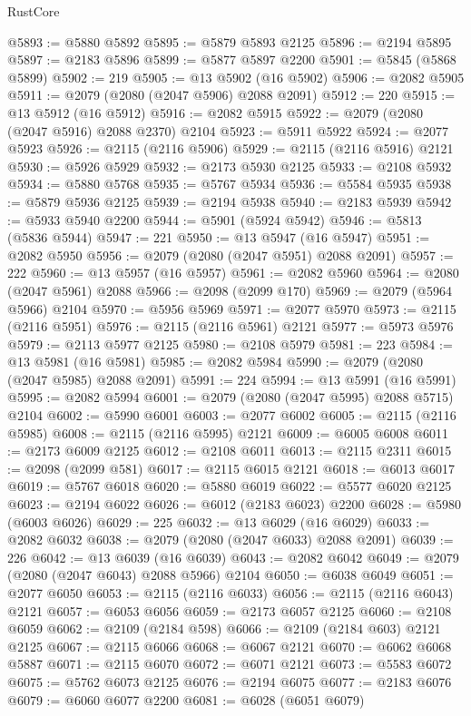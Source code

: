 \begin{lexlean}{RustCore}
\begin{coremodule}
@5893 := @5880 @5892
@5895 := @5879 @5893 @2125
@5896 := @2194 @5895
@5897 := @2183 @5896
@5899 := @5877 @5897 @2200
@5901 := @5845 (@5868 @5899)
@5902 := 219
@5905 := @13 @5902 (@16 @5902)
@5906 := @2082 @5905
@5911 := @2079 (@2080 (@2047 @5906) @2088 @2091)
@5912 := 220
@5915 := @13 @5912 (@16 @5912)
@5916 := @2082 @5915
@5922 := @2079 (@2080 (@2047 @5916) @2088 @2370) @2104
@5923 := @5911 @5922
@5924 := @2077 @5923
@5926 := @2115 (@2116 @5906)
@5929 := @2115 (@2116 @5916) @2121
@5930 := @5926 @5929
@5932 := @2173 @5930 @2125
@5933 := @2108 @5932
@5934 := @5880 @5768
@5935 := @5767 @5934
@5936 := @5584 @5935
@5938 := @5879 @5936 @2125
@5939 := @2194 @5938
@5940 := @2183 @5939
@5942 := @5933 @5940 @2200
@5944 := @5901 (@5924 @5942)
@5946 := @5813 (@5836 @5944)
@5947 := 221
@5950 := @13 @5947 (@16 @5947)
@5951 := @2082 @5950
@5956 := @2079 (@2080 (@2047 @5951) @2088 @2091)
@5957 := 222
@5960 := @13 @5957 (@16 @5957)
@5961 := @2082 @5960
@5964 := @2080 (@2047 @5961) @2088
@5966 := @2098 (@2099 @170)
@5969 := @2079 (@5964 @5966) @2104
@5970 := @5956 @5969
@5971 := @2077 @5970
@5973 := @2115 (@2116 @5951)
@5976 := @2115 (@2116 @5961) @2121
@5977 := @5973 @5976
@5979 := @2113 @5977 @2125
@5980 := @2108 @5979
@5981 := 223
@5984 := @13 @5981 (@16 @5981)
@5985 := @2082 @5984
@5990 := @2079 (@2080 (@2047 @5985) @2088 @2091)
@5991 := 224
@5994 := @13 @5991 (@16 @5991)
@5995 := @2082 @5994
@6001 := @2079 (@2080 (@2047 @5995) @2088 @5715) @2104
@6002 := @5990 @6001
@6003 := @2077 @6002
@6005 := @2115 (@2116 @5985)
@6008 := @2115 (@2116 @5995) @2121
@6009 := @6005 @6008
@6011 := @2173 @6009 @2125
@6012 := @2108 @6011
@6013 := @2115 @2311
@6015 := @2098 (@2099 @581)
@6017 := @2115 @6015 @2121
@6018 := @6013 @6017
@6019 := @5767 @6018
@6020 := @5880 @6019
@6022 := @5577 @6020 @2125
@6023 := @2194 @6022
@6026 := @6012 (@2183 @6023) @2200
@6028 := @5980 (@6003 @6026)
@6029 := 225
@6032 := @13 @6029 (@16 @6029)
@6033 := @2082 @6032
@6038 := @2079 (@2080 (@2047 @6033) @2088 @2091)
@6039 := 226
@6042 := @13 @6039 (@16 @6039)
@6043 := @2082 @6042
@6049 := @2079 (@2080 (@2047 @6043) @2088 @5966) @2104
@6050 := @6038 @6049
@6051 := @2077 @6050
@6053 := @2115 (@2116 @6033)
@6056 := @2115 (@2116 @6043) @2121
@6057 := @6053 @6056
@6059 := @2173 @6057 @2125
@6060 := @2108 @6059
@6062 := @2109 (@2184 @598)
@6066 := @2109 (@2184 @603) @2121 @2125
@6067 := @2115 @6066
@6068 := @6067 @2121
@6070 := @6062 @6068 @5887
@6071 := @2115 @6070
@6072 := @6071 @2121
@6073 := @5583 @6072
@6075 := @5762 @6073 @2125
@6076 := @2194 @6075
@6077 := @2183 @6076
@6079 := @6060 @6077 @2200
@6081 := @6028 (@6051 @6079)

\end{coremodule}
\end{lexlean}

